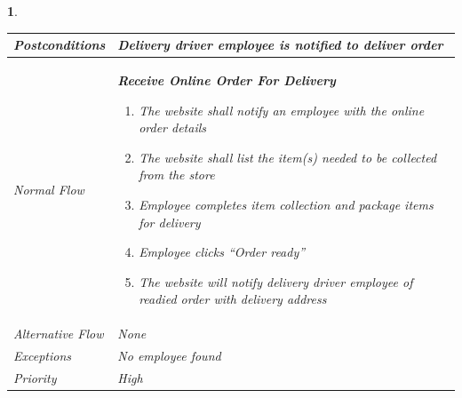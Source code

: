 \documentclass{scrreprt}
\theoremstyle{funreq}
\newtheorem{funreq}{}
\begin{document}
\begin{funreq}
\begin{table}[H]
{\begin{tabularx}{\columnwidth}{|l|X|}
					\\ \hline Postconditions   & 
					Delivery driver employee is notified to deliver order 
					\\ \hline Normal Flow &
					\bfseries{Receive Online Order For Delivery}\normalfont\newline 
					\begin{enumerate}
					    \item The website shall notify an employee with the online order details
					    \item The website shall list the item(s) needed to be collected from the store
                        \item Employee completes item collection and package items for delivery
                        \item Employee clicks “Order ready”
                        \item The website will notify delivery driver employee of readied order with delivery address
					\end{enumerate}
					\\ \hline Alternative Flow & 
					None
					\\ \hline Exceptions & 
					No employee found
					\\ \hline Priority & 
					High
					\\ \hline
				\end{tabularx}%
			}
		\end{table}
	\end{funreq}


\end{document}
